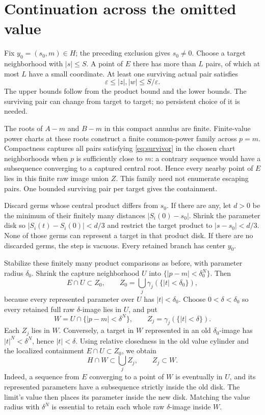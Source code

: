 \documentclass[11pt]{article}
\numberwithin{equation}{section}
\begin{document}
\section{Continuation across the omitted value}\label{sec:omitted}

Fix $y_0=(s_0,m)\in H$; the preceding exclusion gives $s_0\ne0$.
Choose a target neighborhood with $|s|\le S$.
A point of $E$ there has more than $L$ pairs, of which at most $L$
have a small coordinate. At least one surviving actual pair satisfies
\begin{equation}\label{eq:survivor}
 \varepsilon\le |z|,|w|\le S/\varepsilon.
\end{equation}
The upper bounds follow from the product bound and the lower bounds.
The surviving pair can change from target to target; no persistent choice
of it is needed.

The roots of $A-m$ and $B-m$ in this compact annulus are finite.
Finite-value power charts at these roots construct a finite common-power
family across $p=m$. Compactness captures all pairs satisfying
\eqref{eq:survivor} in the chosen chart neighborhoods when $p$ is
sufficiently close to $m$: a contrary sequence would have a subsequence
converging to a captured central root. Hence every nearby point of $E$
lies in this finite raw image union $Z$. This family need not enumerate
escaping pairs. One bounded surviving pair per target gives the containment.

Discard germs whose central product differs from $s_0$. If there are any,
let $d>0$ be the minimum of their finitely many distances $|S_i(0)-s_0|$.
Shrink the parameter disk so $|S_i(t)-S_i(0)|<d/3$ and restrict the target
product to $|s-s_0|<d/3$. None of those germs can represent a target in
that product disk. If there are no discarded germs, the step is vacuous.
Every retained branch has center $y_0$.

Stabilize these finitely many product comparisons as before, with parameter
radius $\delta_0$. Shrink the capture neighborhood $U$ into
$\{|p-m|<\delta_0^N\}$. Then
\[
 E\cap U\subset Z_0,\qquad
 Z_0=\bigcup_j\gamma_j(\{|t|<\delta_0\}),
\]
because every represented parameter over $U$ has $|t|<\delta_0$.
Choose $0<\delta<\delta_0$ so every retained full raw $\delta$-image lies
in $U$, and put
\[
 W=U\cap\{|p-m|<\delta^N\},\qquad
 Z_j=\gamma_j(\{|t|<\delta\}).
\]
Each $Z_j$ lies in $W$. Conversely, a target in $W$ represented in an old
$\delta_0$-image has $|t|^N<\delta^N$, hence $|t|<\delta$.
Using relative closedness in the old value cylinder and the localized
containment $E\cap U\subset Z_0$, we obtain
\begin{equation}\label{eq:boundarycontainment}
 H\cap W\subset\bigcup_j Z_j,\qquad Z_j\subset W.
\end{equation}
Indeed, a sequence from $E$ converging to a point of $W$ is eventually in
$U$, and its represented parameters have a subsequence strictly inside
the old disk. The limit's value then places its parameter inside the
new disk. Matching the value radius with $\delta^N$ is essential to
retain each whole raw $\delta$-image inside $W$.
\end{document}

